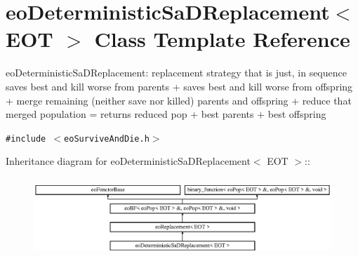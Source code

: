 \section{eo\-Deterministic\-Sa\-DReplacement$<$ EOT $>$ Class Template Reference}
\label{classeo_deterministic_sa_d_replacement}
eo\-Deterministic\-Sa\-DReplacement: replacement strategy that is just, in sequence saves best and kill worse from parents + saves best and kill worse from offspring + merge remaining (neither save nor killed) parents and offspring + reduce that merged population = returns reduced pop + best parents + best offspring  


{\tt \#include $<$eo\-Survive\-And\-Die.h$>$}

Inheritance diagram for eo\-Deterministic\-Sa\-DReplacement$<$ EOT $>$::\begin{figure}[H]
\begin{center}
\leavevmode
\includegraphics[height=3.01075cm]{classeo_deterministic_sa_d_replacement}
\end{center}
\end{figure}
